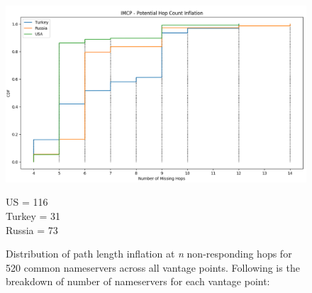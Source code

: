                         





\begin{figure}[!h]
\centering
  \includegraphics[width=\linewidth]{figures/missing-hops-cdf.png}
  \caption{Distribution of path length inflation at \textit{n} non-responding hops for 520 common nameservers across all vantage points. Following is the breakdown of number of nameservers for each vantage point:}
  \label{fig:inflated-path-cdf}
  
  US = 116\\
  Turkey = 31\\
  Russia = 73\\
  
\end{figure}

